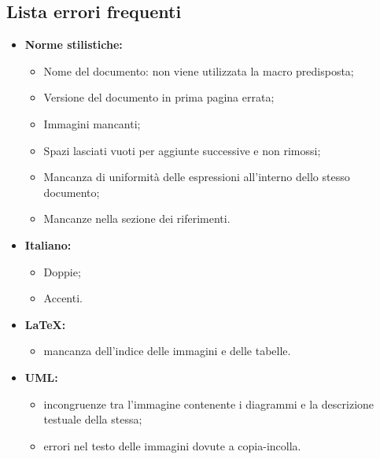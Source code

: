 \documentclass[a4paper]{article}
\begin{document}
			\subsection{Lista errori frequenti}
			\begin{itemize}
					\item \textbf{Norme stilistiche:}
					\begin{itemize}
						\item Nome del documento: non viene utilizzata la macro predisposta;
						\item Versione del documento in prima pagina errata;
						\item Immagini mancanti;
						\item Spazi lasciati vuoti per aggiunte successive e non rimossi;
						\item Mancanza di uniformità delle espressioni all'interno dello stesso documento;
						\item Mancanze nella sezione dei riferimenti.
					\end{itemize}
					\item \textbf{Italiano:}
					\begin{itemize}
						\item Doppie;
						\item Accenti.
					\end{itemize}
					\item \textbf{\LaTeX :}
					\begin{itemize}
						\item mancanza dell'indice delle immagini e delle tabelle.
					\end{itemize}
					\item \textbf{UML:}
					\begin{itemize}
						\item incongruenze tra l'immagine contenente i diagrammi e la descrizione testuale della stessa;
						\item errori nel testo delle immagini dovute a copia-incolla.
					\end{itemize}
				\end{itemize}
				
\cleardoublepage
	\listoffigures
	
	\cleardoublepage
	\listoftables	
\end{document}
